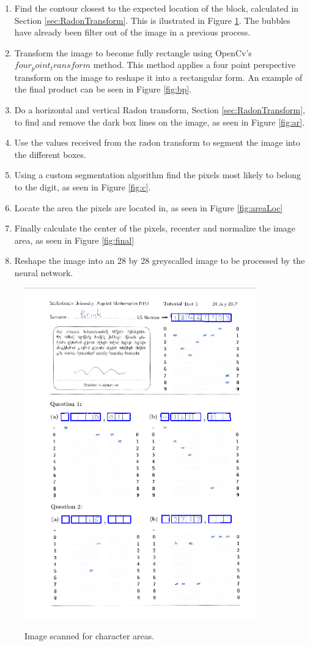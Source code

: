 \begin{enumerate}
\item Find the contour closest to the expected location of the block, calculated in Section \ref{sec:RadonTransform}. This is ilustrated in Figure \ref{fig:sa}. The bubbles have already been filter out of the image in a previous process.
\item Transform the image to become fully rectangle using OpenCv's $four_point_transform$ method. This method applies a four point perspective transform on the image to reshape it into a rectangular form. An example of the final product can be seen in Figure \ref{fig:bp}.
\item Do a horizontal and vertical Radon transform, Section \ref{sec:RadonTransform}, to find and remove the dark box lines on the image, as seen in Figure \ref{fig:ar}.
\item Use the values received from the radon transform to segment the image into the different boxes.
\item Using a custom segmentation algorithm find the pixels most likely to belong to the digit, as seen in Figure \ref{fig:c}.
\item Locate the area the pixels are located in, as seen in Figure \ref{fig:areaLoc}
\item Finally calculate the center of the pixels, recenter and normalize the image area, as seen in Figure \ref{fig:final}
\item Reshape the image into an 28 by 28 greyscalled image to be processed by the neural network.
\end{enumerate}

\begin{figure}
  \centering
  \includegraphics[width=10cm]{DigitScan}\\
  \caption{Image scanned for character areas.}
  \label{fig:sa}
\end{figure}

